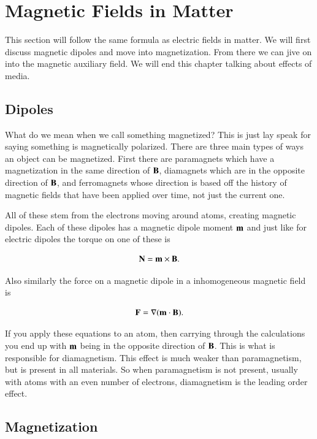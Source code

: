 \documentclass[preprint, review,12pt]{elsarticle}
\def\x{\times}
\def\.{\cdot}
\def\b{\textbf}
\begin{document}
\section{Magnetic Fields in Matter}

This section will follow the same formula as electric fields in matter. We will first discuss magnetic dipoles and move into magnetization. From there we can jive on into the magnetic auxiliary field. We will end this chapter talking about effects of media.

\subsection{Dipoles}

What do we mean when we call something magnetized? This is just lay speak for saying something is magnetically polarized. There are three main types of ways an object can be magnetized. First there are paramagnets which have a magnetization in the same direction of $\b B$, diamagnets which are in the opposite direction of $\b B$, and ferromagnets whose direction is based off the history of magnetic fields that have been applied over time, not just the current one.

All of these stem from the electrons moving around atoms, creating magnetic dipoles. Each of these dipoles has a magnetic dipole moment $\b m$ and just like for electric dipoles the torque on one of these is

\begin{equation}
    \b N = \b m \x \b B.
\end{equation}

Also similarly the force on a magnetic dipole in a inhomogeneous magnetic field is

\begin{equation}
    \b F = \nabla (\b m \. \b B).
\end{equation}

If you apply these equations to an atom, then carrying through the calculations you end up with $\b m$ being in the opposite direction of $\b B$. This is what is responsible for diamagnetism. This effect is much weaker than paramagnetism, but is present in all materials. So when paramagnetism is not present, usually with atoms with an even number of electrons, diamagnetism is the leading order effect.

\subsection{Magnetization}
\end{document}
